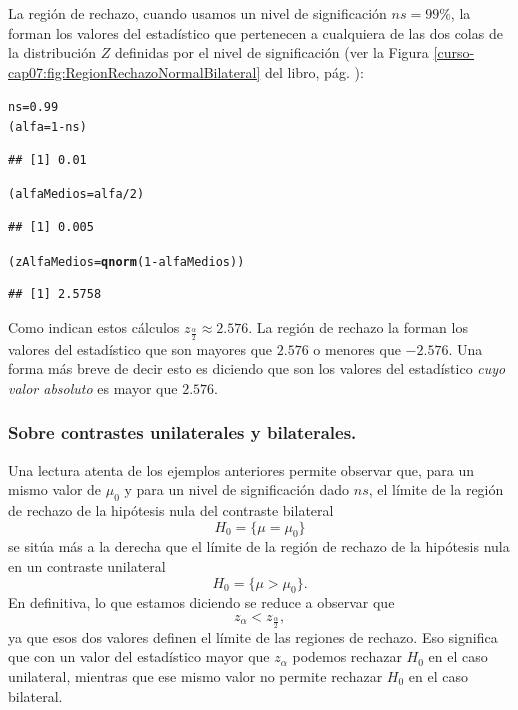 \documentclass[10pt,a4paper]{article}\usepackage[]{graphicx}\usepackage[]{color}
\makeatletter
\newcommand{\hlnum}[1]{\textcolor[rgb]{0.686,0.059,0.569}{#1}}%
\newcommand{\hlopt}[1]{\textcolor[rgb]{0,0,0}{#1}}%
\newcommand{\hlstd}[1]{\textcolor[rgb]{0.345,0.345,0.345}{#1}}%
\newcommand{\hlkwb}[1]{\textcolor[rgb]{0.69,0.353,0.396}{#1}}%
\newcommand{\hlkwd}[1]{\textcolor[rgb]{0.737,0.353,0.396}{\textbf{#1}}}%
\newenvironment{kframe}{%
 \def\at@end@of@kframe{}%
 \ifinner\ifhmode%
  \def\at@end@of@kframe{\end{minipage}}%
  \begin{minipage}{\columnwidth}%
 \fi\fi%
 \def\FrameCommand##1{\hskip\@totalleftmargin \hskip-\fboxsep
 \colorbox{shadecolor}{##1}\hskip-\fboxsep
     \hskip-\linewidth \hskip-\@totalleftmargin \hskip\columnwidth}%
 \MakeFramed {\advance\hsize-\width
   \@totalleftmargin\z@ \linewidth\hsize
   \@setminipage}}%
 {\par\unskip\endMakeFramed%
 \at@end@of@kframe}
\newenvironment{knitrout}{}{} %
\newcounter {cont01}
\makeatother
\begin{document}
La región de rechazo, cuando usamos un nivel de significación  $ns = 99\%$, la forman los valores del estadístico  que pertenecen a cualquiera de las dos colas de la distribución $Z$ definidas por el nivel de significación (ver la Figura \ref{curso-cap07:fig:RegionRechazoNormalBilateral} del libro, pág. \pageref{curso-cap07:fig:RegionRechazoNormalBilateral}):
\begin{knitrout}
\color{fgcolor}\begin{kframe}
\begin{alltt}
\hlstd{ns} \hlkwb{=} \hlnum{0.99}
\hlstd{(alfa} \hlkwb{=} \hlnum{1} \hlopt{-} \hlstd{ns)}
\end{alltt}
\begin{verbatim}
## [1] 0.01
\end{verbatim}
\begin{alltt}
\hlstd{(alfaMedios} \hlkwb{=} \hlstd{alfa} \hlopt{/} \hlnum{2}\hlstd{)}
\end{alltt}
\begin{verbatim}
## [1] 0.005
\end{verbatim}
\begin{alltt}
\hlstd{(zAlfaMedios} \hlkwb{=} \hlkwd{qnorm}\hlstd{(}\hlnum{1} \hlopt{-} \hlstd{alfaMedios))}
\end{alltt}
\begin{verbatim}
## [1] 2.5758
\end{verbatim}
\end{kframe}
\end{knitrout}
Como indican estos cálculos $z_{\frac{\alpha}{2}}\approx 2.576$. La región de rechazo la forman los valores del estadístico que son mayores que $2.576$ o menores que $-2.576$. Una forma más breve de decir esto es diciendo que son los valores del estadístico {\em cuyo valor absoluto} es mayor que $2.576$.

\subsubsection{Sobre contrastes unilaterales y bilaterales.}

Una lectura atenta de los ejemplos anteriores permite observar que, para un mismo valor de $\mu_0$ y para un nivel de significación dado $ns$, el límite de la región de rechazo de la hipótesis nula del contraste bilateral
\[H_0 = \{\mu = \mu_0\}\]
se sitúa más a la derecha que el límite de la región de rechazo de la hipótesis nula en un contraste unilateral
\[H_0 = \{\mu > \mu_0\}.\]
En definitiva, lo que estamos diciendo se reduce a observar que
\[z_{\alpha} < z_{\frac{\alpha}{2}},\]
ya que esos dos valores definen el límite de las regiones de rechazo. Eso significa que con un valor del estadístico mayor que  $z_{\alpha}$  podemos rechazar $H_0$ en el caso unilateral, mientras que ese mismo valor no permite rechazar $H_0$ en el caso bilateral.
\end{document}
